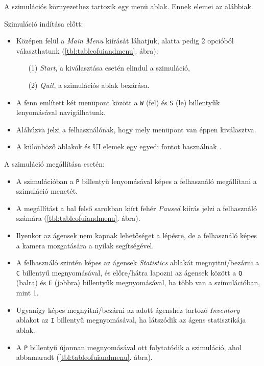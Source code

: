 
A szimulációs környezethez tartozik egy menü ablak. Ennek elemei az alábbiak.

\medskip

\noindent Szimuláció indítása előtt:
\begin{itemize}
    \item Középen felül a \textit{Main Menu} kiírását láhatjuk, alatta pedig 2 opcióból választhatunk (\ref{tbl:tableofuiandmenu}. ábra):
    \begin{itemize}
    \item[(1)] \textit{Start}, a kiválasztása esetén elindul a szimuláció,
    \item[(2)] \textit{Quit}, a szimulációs ablak bezárása.
    \end{itemize}
    \item A fenn említett két menüpont között a \texttt{W} (fel) és \texttt{S} (le) billentyűk lenyomásával navigálhatunk.
    \item Aláhúzva jelzi a felhasználónak, hogy mely menüpont van éppen kiválasztva.
    \item A különböző ablakok és UI elemek egy egyedi fontot használnak \cite{yosterislandfont}.
\end{itemize}

\noindent A szimuláció megállítása esetén:

\begin{itemize}
    \item A szimulációban a \texttt{P} billentyű lenyomásával képes a felhasználó megállítani a szimuláció menetét.
    \item A megállítást a bal felső sarokban kiírt fehér \textit{Paused} kiírás jelzi a felhasználó számára (\ref{tbl:tableofuiandmenu}. ábra).
    \item Ilyenkor az ágensek nem kapnak lehetőséget a lépésre, de a felhasználó képes a kamera mozgatására a nyilak segítségével.
    \item A felhasználó szintén képes az ágensek \textit{Statistics} ablakát megnyitni/bezárni a \texttt{C} billentyű megnyomásával, és előre/hátra lapozni az ágensek között a \texttt{Q} (balra) és \texttt{E} (jobbra) billentyűk megnyomásával, ha több van a szimulációban, mint 1.
    \item Ugyanígy képes megnyitni/bezárni az adott ágenshez tartozó \textit{Inventory} ablakot az \texttt{I} billentyű megnyomásával, ha látszódik az ágens statisztikája ablak.
    \item A \texttt{P} billentyű újonnan megnyomásával ott folytatódik a szimuláció, ahol abbamaradt (\ref{tbl:tableofuiandmenu}. ábra).
\end{itemize}

